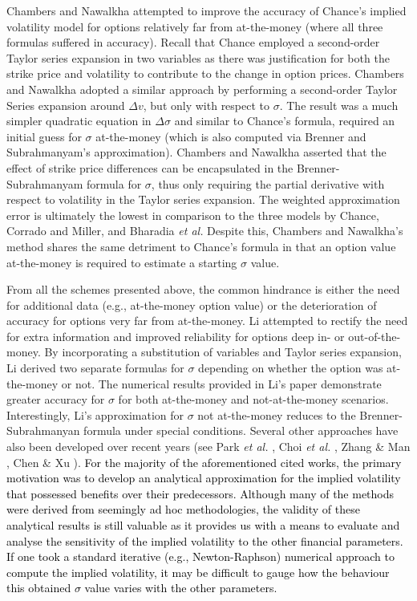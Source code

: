 Chambers and Nawalkha attempted to improve the accuracy of Chance's implied volatility model for options relatively far from at-the-money (where all three formulas suffered in accuracy). Recall that Chance employed a second-order Taylor series expansion in two variables as there was justification for both the strike price and volatility to contribute to the change in option prices. Chambers and Nawalkha adopted a similar approach by performing a second-order Taylor Series expansion around $\Delta v$, but only with respect to $\sigma$. The result was a much simpler quadratic equation in $\Delta \sigma$ and similar to Chance's formula, required an initial guess for $\sigma$ at-the-money (which is also computed via Brenner and Subrahmanyam's approximation). Chambers and Nawalkha asserted that the effect of strike price differences can be encapsulated in the Brenner-Subrahmanyam formula for $\sigma$, thus only requiring the partial derivative with respect to volatility in the Taylor series expansion. The weighted approximation error is ultimately the lowest in comparison to the three models by Chance, Corrado and Miller, and Bharadia \emph{et al.} Despite this, Chambers and Nawalkha's method shares the same detriment to Chance's formula in that an option value at-the-money is required to estimate a starting $\sigma$ value.

From all the schemes presented above, the common hindrance is either the need for additional data (e.g., at-the-money option value) or the deterioration of accuracy for options very far from at-the-money. Li \cite{SLi2005} attempted to rectify the need for extra information and improved reliability for options deep in- or out-of-the-money. By incorporating a substitution of variables and Taylor series expansion, Li derived two separate formulas for $\sigma$ depending on whether the option was at-the-money or not. The numerical results provided in Li's paper demonstrate greater accuracy for $\sigma$ for both at-the-money and not-at-the-money scenarios. Interestingly, Li's approximation for $\sigma$ not at-the-money reduces to the Brenner-Subrahmanyan formula under special conditions. Several other approaches have also been developed over recent years (see Park \emph{et al.} \cite{Park2011}, Choi \emph{et al.} \cite{Choi2011}, Zhang \& Man \cite{Zhang2014}, Chen \& Xu \cite{Chen2014}).
\textcolor{black}{
For the majority of the aforementioned cited works, the primary motivation was to develop an analytical approximation for the implied volatility that possessed benefits over their predecessors. Although many of the methods were derived from seemingly ad hoc methodologies, the validity of these analytical results is still valuable as it provides us with a means to evaluate and analyse the sensitivity of the implied volatility to the other financial parameters. If one took a standard iterative (e.g., Newton-Raphson) numerical approach to compute the implied volatility, it may be difficult to gauge how the behaviour this obtained $\sigma$ value varies with the other parameters.}
		

